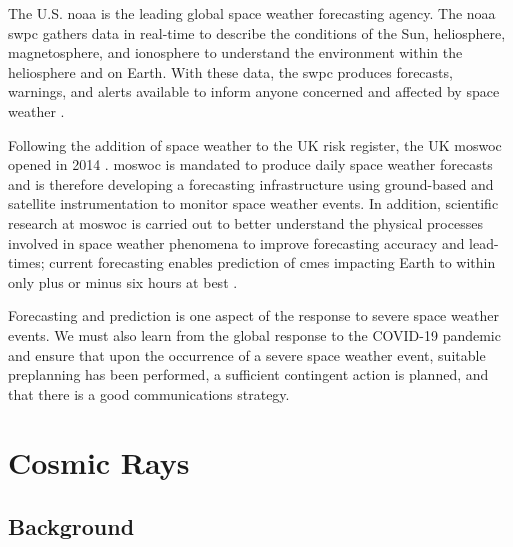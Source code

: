 The U.S. \gls{noaa} is the leading global space weather forecasting agency. The \gls{noaa} \gls{swpc} gathers data in real-time to describe the conditions of the Sun, heliosphere, magnetosphere, and ionosphere to understand the environment within the heliosphere and on Earth. With these data, the \gls{swpc} produces forecasts, warnings, and alerts available to inform anyone concerned and affected by space weather \citep{noaa_noaa_2018}. 

Following the addition of space weather to the UK risk register, the UK \gls{moswoc} opened in 2014 \citep{bis_space_2015}. \gls{moswoc} is mandated to produce daily space weather forecasts and is therefore developing a forecasting infrastructure using ground-based and satellite instrumentation to monitor space weather events. In addition, scientific research at \gls{moswoc} is carried out to better understand the physical processes involved in space weather phenomena to improve forecasting accuracy and lead-times; current forecasting enables prediction of \glspl{cme} impacting Earth to within only plus or minus six hours at best \citep{metoffice_space_2013}.

Forecasting and prediction is one aspect of the response to severe space weather events. We must also learn from the global response to the COVID-19 pandemic and ensure that upon the occurrence of a severe space weather event, suitable preplanning has been performed, a sufficient contingent action is planned, and that there is a good communications strategy.





\glsresetall 
{}
\section{Cosmic Rays}\label{sec:intro_CRs}

\subsection{Background}

